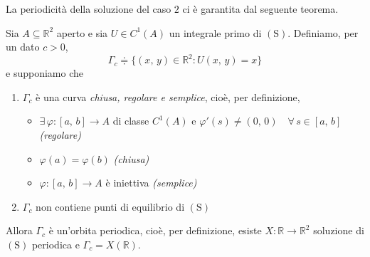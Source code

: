 La periodicità della soluzione del caso $2$ ci è garantita dal seguente teorema.

\begin{thm}
Sia $A \subseteq \mathbb{R}^2$ aperto e sia $U \in C^1(A)$ un integrale primo di $\mathrm{(S)}$. Definiamo, per un dato $c>0$, 
$$
\Gamma_c \doteqdot \lbrace (x,\,y) \in \mathbb{R}^2 : U(x,\,y) = x \rbrace
$$
e supponiamo che
\begin{enumerate}[labelindent=\parindent,leftmargin=*,label=\textnormal{(\roman*)},start=1]
\item $\Gamma_c$ è una curva \emph{chiusa, regolare e semplice}, cioè, per definizione,
	\begin{itemize}
	\item $\exists \, \varphi : [a,\,b] \longrightarrow A$ di classe $C^1(A)$ e $\varphi'(s) \neq (0,\,0) \quad \forall \, s \in [a,\,b]$ \emph{(regolare)}
	\item $\varphi(a) = \varphi(b)$ \emph{(chiusa)}
	\item $\varphi : [a,\,b] \longrightarrow A$ è iniettiva \emph{(semplice)}	
	\end{itemize}
\item $\Gamma_c$ non contiene punti di equilibrio di $\mathrm{(S)}$
\end{enumerate}
Allora $\Gamma_c$ è un'orbita periodica, cioè, per definizione, esiste $X: \mathbb{R} \longrightarrow \mathbb{R}^2$ soluzione di $\mathrm{(S)}$ periodica e $\Gamma_c = X(\mathbb{R})$.
\end{thm}



